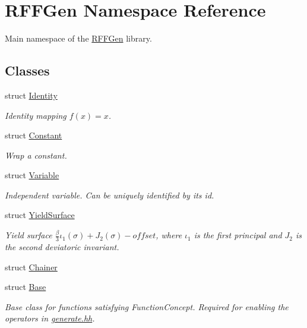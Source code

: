 \hypertarget{namespaceRFFGen}{\section{R\-F\-F\-Gen Namespace Reference}
\label{namespaceRFFGen}
}


Main namespace of the \hyperlink{namespaceRFFGen}{R\-F\-F\-Gen} library.  


\subsection*{Classes}
\begin{DoxyCompactItemize}
\item 
struct \hyperlink{structRFFGen_1_1Identity}{Identity}
\begin{DoxyCompactList}\small\item\em Identity mapping $ f(x)=x $. \end{DoxyCompactList}\item 
struct \hyperlink{structRFFGen_1_1Constant}{Constant}
\begin{DoxyCompactList}\small\item\em Wrap a constant. \end{DoxyCompactList}\item 
struct \hyperlink{structRFFGen_1_1Variable}{Variable}
\begin{DoxyCompactList}\small\item\em Independent variable. Can be uniquely identified by its id. \end{DoxyCompactList}\item 
struct \hyperlink{structRFFGen_1_1YieldSurface}{Yield\-Surface}
\begin{DoxyCompactList}\small\item\em Yield surface $ \frac{\beta}{3}\iota_1(\sigma) + J_2(\sigma)-offset $, where $\iota_1$ is the first principal and $J_2$ is the second deviatoric invariant. \end{DoxyCompactList}\item 
struct \hyperlink{structRFFGen_1_1Chainer}{Chainer}
\item 
struct \hyperlink{structRFFGen_1_1Base}{Base}
\begin{DoxyCompactList}\small\item\em Base class for functions satisfying Function\-Concept. Required for enabling the operators in \hyperlink{generate_8hh_source}{generate.\-hh}. \end{DoxyCompactList}\item 

\end{DoxyCompactItemize}
